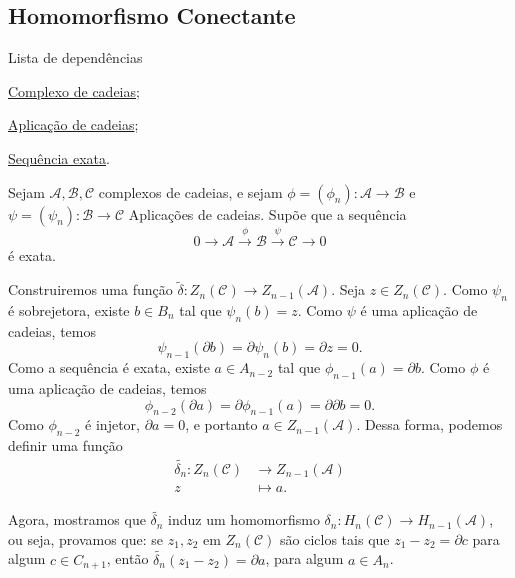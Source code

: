 \subsection{Homomorfismo Conectante} %
\label{homomorfismo-conectante-def}
\begin{titlemize}{Lista de dependências}
	\item \hyperref[complexo-de-cadeias-def]{Complexo de cadeias};\\ 
    \item \hyperref[aplicacao-de-cadeias-def]{Aplicação de cadeias};\\
    \item \hyperref[sequencia-exata-def]{Sequência exata}.
\end{titlemize}

    Sejam $\mathcal{A},\mathcal{B},\mathcal{C}$ complexos de cadeias, e sejam $\phi= (\phi_n):\mathcal{A}\rightarrow \mathcal{B}$ e $\psi=(\psi_n):\mathcal{B}\rightarrow \mathcal{C}$ Aplicações de cadeias. Supõe que a sequência 
    \[0\rightarrow \mathcal{A}\xrightarrow{\phi} \mathcal{B}\xrightarrow{\psi} \mathcal{C}\rightarrow 0\]
    é exata. 

    Construiremos uma função $\tilde{\delta}:Z_n(\mathcal{C})\rightarrow Z_{n-1}(\mathcal{A})$. Seja $z\in Z_n(\mathcal{C})$. Como $\psi_n$ é sobrejetora, existe $b\in B_n$ tal que $\psi_n(b)=z$. Como $\psi$ é uma aplicação de cadeias, temos
    \[\psi_{n-1}(\partial b)=\partial\psi_n(b)=\partial z=0.\]
    Como a sequência é exata, existe $a\in A_{n-2}$ tal que $\phi_{n-1}(a)=\partial b$. Como $\phi$ é uma aplicação de cadeias, temos
    \[\phi_{n-2}(\partial a)=\partial \phi_{n-1}(a)=\partial\partial b=0.\]
    Como $\phi_{n-2}$ é injetor, $\partial a=0$, e portanto $a\in Z_{n-1}(\mathcal{A})$. Dessa forma, podemos definir uma função 
    \begin{align*}
        \tilde{\delta_n}:Z_n(\mathcal{C})&\longrightarrow Z_{n-1}(\mathcal{A})\\
        z&\longmapsto a.
    \end{align*}

    Agora, mostramos que $\tilde{\delta_n}$ induz um homomorfismo $\delta_n:H_n(\mathcal{C})\rightarrow H_{n-1}(\mathcal{A})$, ou seja, provamos que: se $z_1,z_2$ em $Z_n(\mathcal{C})$ são ciclos tais que $z_1-z_2=\partial c$ para algum $c\in C_{n+1}$, então $\tilde{\delta_n}(z_1-z_2)= \partial a$, para algum $a\in A_n$. 

